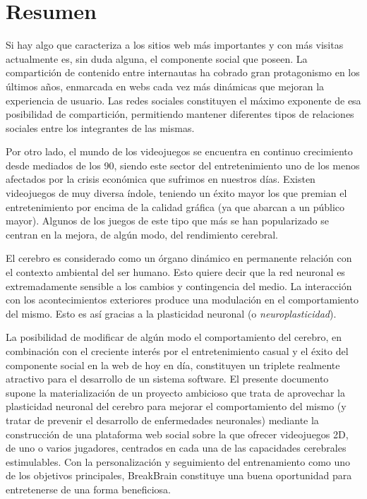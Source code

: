 
\chapter{Resumen}

Si hay algo que caracteriza a los sitios web más importantes y con más visitas actualmente es, sin duda alguna, el componente social que poseen. La compartición de contenido entre internautas ha cobrado gran protagonismo en los últimos años, enmarcada en webs cada vez más dinámicas que mejoran la experiencia de usuario. Las redes sociales constituyen el máximo exponente de esa posibilidad de compartición, permitiendo mantener diferentes tipos de relaciones sociales entre los integrantes de las mismas. 

Por otro lado, el mundo de los videojuegos se encuentra en continuo crecimiento desde mediados de los 90, siendo este sector del entretenimiento uno de los menos afectados por la crisis económica que sufrimos en nuestros días. Existen videojuegos de muy diversa índole, teniendo un éxito mayor los que premian el entretenimiento por encima de la calidad gráfica (ya que abarcan a un público mayor). Algunos de los juegos de este tipo que más se han popularizado se centran en la mejora, de algún modo, del rendimiento cerebral.

El cerebro es considerado como un órgano dinámico en permanente relación con el contexto ambiental del ser humano. Esto quiere decir que la red neuronal es extremadamente sensible a los cambios y contingencia del medio. La interacción con los acontecimientos exteriores produce una modulación en el comportamiento del mismo. Esto es así gracias a la plasticidad neuronal (o {\it neuroplasticidad}).

La posibilidad de modificar de algún modo el comportamiento del cerebro, en combinación con el creciente interés por el entretenimiento casual y el éxito del componente social en la web de hoy en día, constituyen un triplete realmente atractivo para el desarrollo de un sistema software. El presente documento supone la materialización de un proyecto ambicioso que trata de aprovechar la plasticidad neuronal del cerebro para mejorar el comportamiento del mismo (y tratar de prevenir el desarrollo de enfermedades neuronales) mediante la construcción de una plataforma web social sobre la que ofrecer videojuegos 2D, de uno o varios jugadores, centrados en cada una de las capacidades cerebrales estimulables. Con la personalización y seguimiento del entrenamiento como uno de los objetivos principales, BreakBrain constituye una buena oportunidad para entretenerse de una forma beneficiosa.




